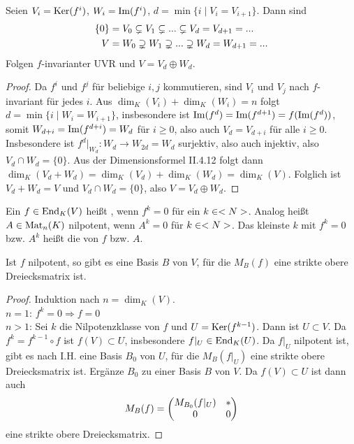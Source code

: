 \begin{proposition}
	Seien $V_i=\operatorname{Ker}(f^i)$, $W_i=\operatorname{Im}(f^i)$, $d=\min\{i\mid V_i=V_{i+1}\}$. Dann sind 
	\begin{align}
		\{0\}&=V_0\subsetneq V_1\subsetneq ...\subsetneq V_d=V_{d+1}=...\notag \\
		V&= W_0\supsetneq W_1\supsetneq ... \supsetneq W_d=W_{d+1}=...\notag
	\end{align}
	Folgen $f$-invarianter UVR und $V=V_d\oplus W_d$.
\end{proposition}
\begin{proof}
	Da $f^i$ und $f^j$ für beliebige $i,j$ kommutieren, sind $V_i$ und $V_j$ nach  $f$-invariant für jedes $i$. Aus $\dim_K(V_i)+\dim_K(W_i)=n$ folgt $d=\min\{i\mid W_i=W_{i+1}\}$, insbesondere ist $\operatorname{Im}(f^d)=\operatorname{Im}(f^{d+1})=f(\operatorname{Im}(f^d))$, somit $W_{d+i}=\operatorname{Im}(f^{d+i})=W_d$ für $i\ge 0$, also auch $V_d=V_{d+i}$ für alle $i\ge 0$. \\
	Insbesondere ist $f^d\vert_{W_d}:W_d\to W_{2d}=W_d$ surjektiv, also auch injektiv, also $V_d\cap W_d=\{0\}$. Aus der Dimensionsformel II.4.12 folgt dann $\dim_K(V_d+W_d)=\dim_K(V_d)+\dim_K(W_d)=\dim_K(V)$. Folglich ist $V_d+W_d=V$ und $V_d\cap W_d=\{0\}$, also $V=V_d\oplus W_d$.
\end{proof}

\begin{definition}[nilpotent]
	Ein $f\in\operatorname{End}_K(V)$ heißt , wenn $f^k=0$ für ein $k\in<N>$. Analog heißt $A\in\operatorname{Mat}_n(K)$ nilpotent, wenn $A^k=0$ für $k\in<N>$. Das kleinste $k$ mit $f^k=0$ bzw. $A^k$ heißt die  von $f$ bzw. $A$.
\end{definition}

\begin{lemma}
	Ist $f$ nilpotent, so gibt es eine Basis $B$ von $V$, für die $M_B(f)$ eine strikte obere Dreiecksmatrix ist.
\end{lemma}
\begin{proof}
	Induktion nach $n=\dim_K(V)$. \\
	\emph{$n=1$}: $f^k=0\Rightarrow f=0$ \\
	\emph{$n>1$}: Sei $k$ die Nilpotenzklasse von $f$ und $U=\operatorname{Ker}(f^{k-1})$. Dann ist $U\subset V$. Da $f^k=f^{k-1}\circ f$ ist $f(V)\subset U$, insbesondere $f\vert_U\in\operatorname{End}_K(U)$. Da $f\vert_U$ nilpotent ist, gibt es nach I.H. eine Basis $B_0$ von $U$, für die $M_B(f\vert_U)$ eine strikte obere Dreiecksmatrix ist. Ergänze $B_0$ zu einer Basis $B$ von $V$. Da $f(V)\subset U$ ist dann auch 
	\begin{align}
		M_B(f)=\begin{pmatrix}M_{B_0}(f\vert_U)&*\\0&0\end{pmatrix}\notag
	\end{align}
	eine strikte obere Dreiecksmatrix.
\end{proof}

